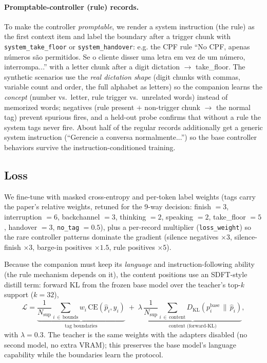 \documentclass[conference]{IEEEtran}
\begin{document}
\paragraph{Promptable-controller (rule) records.} To make the controller
\emph{promptable}, we render a system instruction (the rule) as the first
context item and label the boundary after a trigger chunk with
\texttt{system\_take\_floor} or \texttt{system\_handover}: e.g. the CPF rule
``No CPF, apenas números são permitidos. Se o cliente disser uma letra em vez
de um número, interrompa...'' with a letter chunk after a digit dictation
$\rightarrow$ take\_floor. The synthetic scenarios use the \emph{real
dictation shape} (digit chunks with commas, variable count and order, the
full alphabet as letters) so the companion learns the \emph{concept} (number
vs.\ letter, rule trigger vs.\ unrelated words) instead of memorized words;
negatives (rule present $+$ non-trigger chunk $\rightarrow$ the normal tag)
prevent spurious fires, and a held-out probe confirms that without a rule the
system tags never fire. About half of the regular records additionally get a
generic system instruction (``Gerencie a conversa normalmente...'') so the
base controller behaviors survive the instruction-conditioned training.

\subsection{Loss}
We fine-tune with masked cross-entropy and per-token label weights
(tags carry the paper's relative weights, retuned for the 9-way decision:
finish $=3$, interruption $=6$, backchannel $=3$, thinking $=2$, speaking
$=2$, take\_floor $=5$, handover $=3$, \texttt{no\_tag} $=0.5$), plus a
per-record multiplier (\texttt{loss\_weight}) so the rare controller
patterns dominate the gradient (silence negatives $\times 3$, silence-finish
$\times 3$, barge-in positives $\times 1.5$, rule positives $\times 5$).

Because the companion must keep its \emph{language} and
instruction-following ability (the rule mechanism depends on it), the
content positions use an SDFT-style distill term: forward KL from the frozen
base model over the teacher's top-$k$ support ($k=32$),
\[
\mathcal{L} = \underbrace{\frac{1}{N_{\text{sup}}}\sum_{i\,\in\,\text{bounds}}
w_i\,\text{CE}(\hat{p}_i, y_i)}_{\text{tag boundaries}} \;+\;
\lambda\,\underbrace{\frac{1}{N_{\text{sup}}}\sum_{i\,\in\,\text{content}}
D_{\text{KL}}(p^{\text{base}}_i \,\|\, \hat{p}_i)}_{\text{content
(forward-KL)}},
\]
with $\lambda=0.3$. The teacher is the same weights with the adapters
disabled (no second model, no extra VRAM); this preserves the base model's
language capability while the boundaries learn the protocol.
\end{document}
